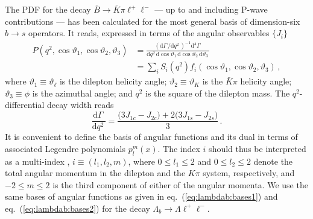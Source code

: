 \documentclass[aps,nofootinbib,preprintnumbers,prd,twocolumn]{revtex4-1}
\newcommand{\refeq}[1]{eq.~(\ref{eq:#1})}
\newcommand{\rmdx}[1]{\mbox{d} #1 \,} %
\renewcommand{\theta}{\vartheta}
\begin{document}
The PDF for the decay $\bar{B}\to\bar{K}\pi\ell^+\ell^-$ --- up to and including P-wave contributions --- has been calculated
for the most general basis of dimension-six $b\to s$ operators. It reads, expressed in terms of the angular observables $\lbrace J_i\rbrace$ \cite{Blake:2012mb,Bobeth:2012vn}
\begin{equation}
\begin{aligned}
    P(q^2, \cos\theta_1, \cos\theta_2, \theta_3)
    & = \frac{(\rmdx{\Gamma}/\rmdx{q^2})^{-1}\rmdx{^4\Gamma}}{\rmdx{q^2} \rmdx{\cos\theta_1} \rmdx{\cos\theta_2} \rmdx{\theta_3}}\\
    & = \sum_i S_i(q^2) f_i(\cos\theta_1, \cos\theta_2, \theta_3)\,,
\end{aligned}
\end{equation}
where $\theta_1 \equiv \theta_\ell$ is the dilepton helicity angle; $\theta_2 \equiv \theta_{K}$ is the $\bar{K}\pi$ helicity angle; $\theta_3 \equiv \phi$ is the azimuthal angle;
and $q^2$ is the square of the dilepton mass. The $q^2$-differential decay width reads
\begin{equation}
    \frac{\rmdx{\Gamma}}{\rmdx{q^2}} = \frac{\big(3 J_{1c} - J_{2c}\big) + 2\big(3J_{1s} - J_{2s}\big)}{3}\,.
\end{equation}
It is convenient to define the basis of angular functions and its dual in terms of
associated Legendre polynomials $p_l^m(x)$. The index $i$ should thus be interpreted as a multi-index
, $i \equiv (l_1, l_2, m)$, where $0 \leq l_1 \leq 2$ and $0 \leq l_2 \leq 2$ denote the total angular
momentum in the dilepton and the $K\pi$ system, respectively, and $-2 \leq m \leq 2$
is the third component of either of the angular momenta.
We use the same bases of angular functions as given in \refeq{lambdab:bases1} and \refeq{lambdab:bases2}
for the decay $\Lambda_b\to \Lambda\ell^+\ell^-$.
\end{document}
